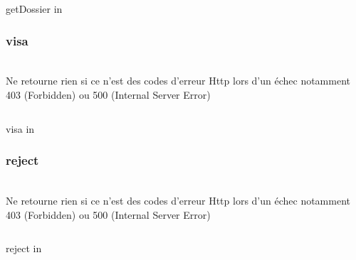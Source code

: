 \begin{codesnippet}
\inputminted[frame=single,linenos,fontsize=\footnotesize]{javascript}{extraits/getDossier_in.js}
\caption{getDossier in}
\label{snip:getDossier_out}
\end{codesnippet}

\subsubsection{visa}
\\

Ne retourne rien si ce n'est des codes d'erreur Http lors d'un échec notamment 403 (Forbidden) ou 500 (Internal Server Error)

\begin{codesnippet}
\inputminted[frame=single,linenos,fontsize=\footnotesize]{javascript}{extraits/visa_in.js}
\caption{visa in}
\label{snip:visa_in}
\end{codesnippet}

\subsubsection{reject}
\\

Ne retourne rien si ce n'est des codes d'erreur Http lors d'un échec notamment 403 (Forbidden) ou 500 (Internal Server Error)

\begin{codesnippet}
\inputminted[frame=single,linenos,fontsize=\footnotesize]{javascript}{extraits/reject_in.js}
\caption{reject in}
\label{snip:reject_in}
\end{codesnippet}
